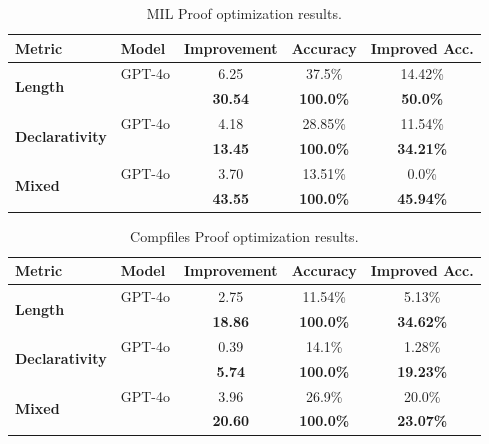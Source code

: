 \begin{table}[t]
\caption{MIL Proof optimization results.}
\label{tab:main-mil}
\centering
\small
\begin{tabular}{ll|ccc}
\toprule
Metric& Model &Improvement &Accuracy& Improved Acc.\\
\midrule
\multirow{2}{*}{\textbf{Length}} & GPT-4o & 6.25 & 37.5\% & 14.42\% \\
&\methodname{} & \textbf{30.54} & \textbf{100.0\%} & \textbf{50.0\%} \\
\midrule
\multirow{2}{*}{\textbf{Declarativity}} & GPT-4o &4.18 & 28.85\% & 11.54\% \\
&\methodname{} & \textbf{13.45} & \textbf{100.0\%} & \textbf{34.21\%}\\
\midrule
\multirow{2}{*}{\textbf{Mixed}} & GPT-4o &3.70 & 13.51\% & 0.0\% \\
&\methodname{} & \textbf{43.55} & \textbf{100.0\%} & \textbf{45.94\%}\\
\bottomrule
\end{tabular}


\vspace{-1em} %
\end{table}

\begin{table}[t]
\caption{Compfiles Proof optimization results.}
\label{tab:main-compfiles}
\centering
\small
\begin{tabular}{ll|ccc}
\toprule
Metric& Model &Improvement &Accuracy& Improved Acc.\\
\midrule
\multirow{2}{*}{\textbf{Length}} & GPT-4o & 2.75 & 11.54\% & 5.13\% \\
&\methodname{} & \textbf{18.86} & \textbf{100.0\%} & \textbf{34.62\%}\\
\midrule
\multirow{2}{*}{\textbf{Declarativity}} & GPT-4o & 0.39 & 14.1\% & 1.28\% \\
&\methodname{} & \textbf{5.74} & \textbf{100.0\%} & \textbf{19.23\%}\\
\midrule
\multirow{2}{*}{\textbf{Mixed}} & GPT-4o &3.96 & 26.9\% & 20.0\% \\
&\methodname{} & \textbf{20.60} & \textbf{100.0\%} & \textbf{23.07\%}\\
\bottomrule
\end{tabular}



\vspace{-1em} %
\end{table}

